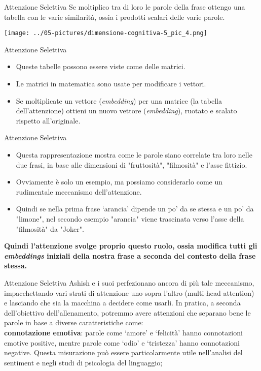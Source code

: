 \documentclass[aspectratio=169]{beamer}
\begin{document}
%
%
\begin{frame}{Attenzione Selettiva}
Se moltiplico tra di loro le parole della frase ottengo una tabella con
le varie similarità, ossia i prodotti scalari delle varie parole.
\begin{center}
\texttt{[image: ../05-pictures/dimensione-cognitiva-5\_pic\_4.png]} 
\end{center}
\end{frame}
%
%
\begin{frame}{Attenzione Selettiva}
\begin{itemize}
\item Queste tabelle possono essere viste come delle matrici. 
\item Le matrici in matematica sono usate per modificare i vettori. 
\item Se moltiplicate un vettore (\emph{embedding}) per una matrice (la tabella dell'attenzione) ottieni un nuovo vettore (\emph{embedding}), ruotato e scalato rispetto all'originale.
\end{itemize}
\end{frame}
%
%
\begin{frame}{Attenzione Selettiva}
\begin{itemize}
\item Questa rappresentazione mostra come le parole siano correlate tra loro nelle due frasi, in base alle dimensioni di "fruttosità",
"filmosità" e l'asse fittizio. 
\item Ovviamente è solo un esempio, ma
possiamo considerarlo come un rudimentale meccanismo dell'attenzione.
\item Quindi se nella prima frase `arancia' dipende un po' da se stessa e un
po' da "limone", nel secondo esempio "arancia" viene trascinata verso
l'asse della "filmosità" da "Joker".
\end{itemize}
\vspace{0.5cm}
\textbf{Quindi l'attenzione svolge proprio questo ruolo, ossia modifica tutti gli \emph{embeddings} iniziali della nostra frase a seconda del contesto della frase stessa.}
\end{frame}
%
%
\begin{frame}{Attenzione Selettiva}
Ashish e i suoi perfezionano ancora di più tale meccanismo, impacchettando vari strati di attenzione uno sopra l’altro (multi-head attention) e lasciando che sia la macchina a decidere come usarli. In pratica, a seconda dell’obiettivo dell’allenamento, potremmo avere attenzioni che separano bene le parole in base a diverse caratteristiche come: \\
\vspace{0.5cm}
\textbf{connotazione emotiva}: parole come ‘amore’ e ‘felicità’ hanno connotazioni emotive positive, mentre parole come ‘odio’ e ‘tristezza’ hanno connotazioni negative. Questa misurazione può essere particolarmente utile nell’analisi del sentiment e negli studi di psicologia del linguaggio;
\end{frame}
\end{document}
